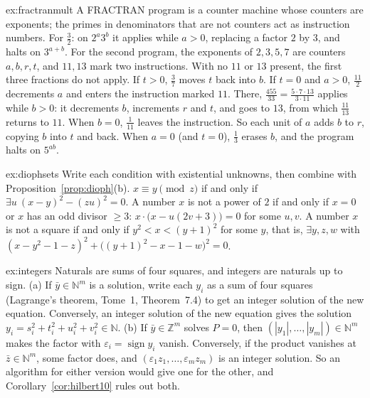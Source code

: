 \begin{solution}{ex:fractranmult}
\idea A FRACTRAN program is a counter machine whose counters are exponents; the primes in denominators that are not counters act as instruction numbers.
\writeup For $\frac32$: on $2^a3^b$ it applies while $a>0$, replacing a factor $2$ by $3$, and halts on $3^{a+b}$. For the second program, the exponents of $2,3,5,7$ are counters $a,b,r,t$, and $11,13$ mark two instructions. With no $11$ or $13$ present, the first three fractions do not apply. If $t>0$, $\frac37$ moves $t$ back into $b$. If $t=0$ and $a>0$, $\frac{11}2$ decrements $a$ and enters the instruction marked $11$. There, $\frac{455}{33}=\frac{5\cdot7\cdot13}{3\cdot11}$ applies while $b>0$: it decrements $b$, increments $r$ and $t$, and goes to $13$, from which $\frac{11}{13}$ returns to $11$. When $b=0$, $\frac1{11}$ leaves the instruction. So each unit of $a$ adds $b$ to $r$, copying $b$ into $t$ and back. When $a=0$ (and $t=0$), $\frac13$ erases $b$, and the program halts on $5^{ab}$.
\end{solution}

\begin{solution}{ex:diophsets}
\idea Write each condition with existential unknowns, then combine with Proposition~\ref{prop:dioph}(b).
\writeup $x\equiv y\pmod z$ if and only if $\exists u\ (x-y)^2-(zu)^2=0$. A number $x$ is not a power of $2$ if and only if $x=0$ or $x$ has an odd divisor $\ge3$: $x\cdot\bigl(x-u(2v+3)\bigr)=0$ for some $u,v$. A number $x$ is not a square if and only if $y^2<x<(y+1)^2$ for some $y$, that is, $\exists y,z,w$ with $(x-y^2-1-z)^2+\bigl((y+1)^2-x-1-w\bigr)^2=0$.
\end{solution}

\begin{solution}{ex:integers}
\idea Naturals are sums of four squares, and integers are naturals up to sign.
\writeup (a) If $\bar y\in\mathbb N^m$ is a solution, write each $y_i$ as a sum of four squares (Lagrange's theorem, Tome~1, Theorem~7.4) to get an integer solution of the new equation. Conversely, an integer solution of the new equation gives the solution $y_i=s_i^2+t_i^2+u_i^2+v_i^2\in\mathbb N$. (b) If $\bar y\in\mathbb Z^m$ solves $P=0$, then $(|y_1|,\dots,|y_m|)\in\mathbb N^m$ makes the factor with $\varepsilon_i=\operatorname{sign}y_i$ vanish. Conversely, if the product vanishes at $\bar z\in\mathbb N^m$, some factor does, and $(\varepsilon_1z_1,\dots,\varepsilon_mz_m)$ is an integer solution. So an algorithm for either version would give one for the other, and Corollary~\ref{cor:hilbert10} rules out both.
\end{solution}

